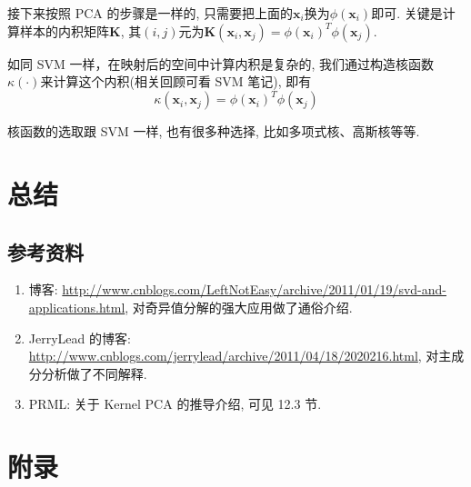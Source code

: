 \documentclass[a4paper,UTF8]{ctexart}
\theoremstyle{plain} \newtheorem{theorem}{定理}[section]
\theoremstyle{plain} \newtheorem{definition}{定义}[section]
\theoremstyle{plain} \newtheorem{lemma}{引理}[section]
\theoremstyle{plain} \newtheorem{proposition}{命题}[section]
\theoremstyle{plain} \newtheorem{example}{例}[section]
\theoremstyle{plain} \newtheorem{remark}{注}[section]
\theoremstyle{plain} \newtheorem{corollary}{推论}[section]
\begin{document}
接下来按照 PCA 的步骤是一样的, 只需要把上面的$\bm{x}_i$换为$\phi(\bm{x}_i)$即可. 关键是计算样本的内积矩阵$\bm{K}$, 其$(i, j)$元为$\bm{K}(\bm{x}_i, \bm{x}_j) = \phi(\bm{x}_i)^{T} \phi(\bm{x}_j)$.

如同 SVM 一样，在映射后的空间中计算内积是复杂的, 我们通过构造核函数$\kappa(\cdot)$来计算这个内积(相关回顾可看 SVM 笔记), 即有
\begin{equation*}
\kappa(\bm{x}_i, \bm{x}_j) = \phi(\bm{x}_i)^{T} \phi(\bm{x}_j)
\end{equation*}

核函数的选取跟 SVM 一样, 也有很多种选择, 比如多项式核、高斯核等等. 






\section{总结}
\subsection{参考资料}
\begin{enumerate}[(1)]
\item 博客: \url{http://www.cnblogs.com/LeftNotEasy/archive/2011/01/19/svd-and-applications.html}, 对奇异值分解的强大应用做了通俗介绍.

\item JerryLead 的博客: \url{http://www.cnblogs.com/jerrylead/archive/2011/04/18/2020216.html}, 对主成分分析做了不同解释.

\item PRML: 关于 Kernel PCA 的推导介绍, 可见 12.3 节.

\end{enumerate}



\newpage

\section*{附录}
\end{document}

